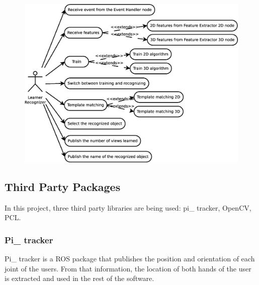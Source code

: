 \begin{itemize}
\begin{figure}[H]
\begin{center}

		\includegraphics[scale=0.4]{img/diagrams/uc_learner_recognizer.eps}
	\end{center}
\end{figure}



\end{itemize}





\subsection{Third Party Packages}
\hspace{0.5cm}In this project, three third party libraries are being used: pi\_ tracker, OpenCV, PCL. 
\subsubsection{ Pi\_ tracker}
Pi\_ tracker is a ROS package that publishes the position and orientation of each joint of the users. From that information, the location of both hands of the user is extracted and used in the rest of the software. 
